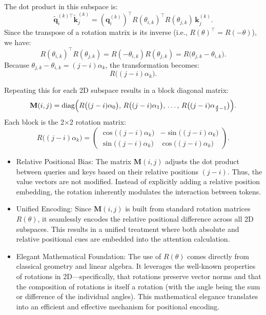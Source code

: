 The dot product in this subspace is:
\[
\tilde{\mathbf{q}}_i^{(k)\top} \tilde{\mathbf{k}}_j^{(k)} 
= \left(\mathbf{q}_i^{(k)}\right)^\top R(\theta_{i,k})^\top R(\theta_{j,k}) \, \mathbf{k}_j^{(k)}.
\]
Since the transpose of a rotation matrix is its inverse (i.e., \(R(\theta)^\top = R(-\theta)\)), we have:
\[
R(\theta_{i,k})^\top R(\theta_{j,k}) = R(-\theta_{i,k})R(\theta_{j,k}) = R\bigl(\theta_{j,k} - \theta_{i,k}\bigr).
\]
Because \(\theta_{j,k} - \theta_{i,k} = (j-i)\alpha_k\), the transformation becomes:
\[
R\bigl((j-i)\alpha_k\bigr).
\]

Repeating this for each 2D subspace results in a block diagonal matrix:
\[
\mathbf{M}(i,j) = \text{diag}\Bigl(
R\bigl((j-i)\alpha_0\bigr),\,
R\bigl((j-i)\alpha_1\bigr),\,
\ldots,\,
R\bigl((j-i)\alpha_{\frac{d}{2}-1}\bigr)
\Bigr).
\]
Each block is the 2×2 rotation matrix:
\[
R\bigl((j-i)\alpha_k\bigr)
= \begin{pmatrix}
\cos\bigl((j-i)\alpha_k\bigr) & -\sin\bigl((j-i)\alpha_k\bigr) \\
\sin\bigl((j-i)\alpha_k\bigr) & \cos\bigl((j-i)\alpha_k\bigr)
\end{pmatrix}.
\]

\begin{itemize}
	\item Relative Positional Bias:  
  The matrix \(\mathbf{M}(i,j)\) adjusts the dot product between queries and keys based on their relative positions \((j-i)\). Thus, the value vectors are not modified. Instead of explicitly adding a relative position embedding, the rotation inherently modulates the interaction between tokens.
	\item Unified Encoding: Since \(\mathbf{M}(i,j)\) is built from standard rotation matrices \(R(\theta)\), it seamlessly encodes the relative positional difference across all 2D subspaces. This results in a unified treatment where both absolute and relative positional cues are embedded into the attention calculation.
	\item Elegant Mathematical Foundation: The use of \(R(\theta)\) comes directly from classical geometry and linear algebra. It leverages the well-known properties of rotations in 2D—specifically, that rotations preserve vector norms and that the composition of rotations is itself a rotation (with the angle being the sum or difference of the individual angles). This mathematical elegance translates into an efficient and effective mechanism for positional encoding.
\end{itemize}

